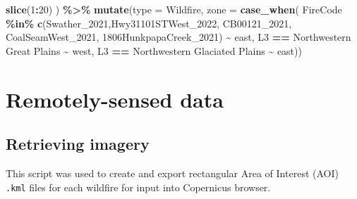 \documentclass[
]{article}
\newenvironment{Shaded}{\begin{snugshade}}{\end{snugshade}}
\newcommand{\AttributeTok}[1]{\textcolor[rgb]{0.13,0.29,0.53}{#1}}
\newcommand{\DecValTok}[1]{\textcolor[rgb]{0.00,0.00,0.81}{#1}}
\newcommand{\FunctionTok}[1]{\textcolor[rgb]{0.13,0.29,0.53}{\textbf{#1}}}
\newcommand{\NormalTok}[1]{#1}
\newcommand{\SpecialCharTok}[1]{\textcolor[rgb]{0.81,0.36,0.00}{\textbf{#1}}}
\newcommand{\StringTok}[1]{\textcolor[rgb]{0.31,0.60,0.02}{#1}}
\begin{document}
\begin{Shaded}
\begin{Highlighting}[]
        \FunctionTok{slice}\NormalTok{(}\DecValTok{1}\SpecialCharTok{:}\DecValTok{20}\NormalTok{) ) }\SpecialCharTok{\%\textgreater{}\%}
     \FunctionTok{mutate}\NormalTok{(}\AttributeTok{type =} \StringTok{\textquotesingle{}Wildfire\textquotesingle{}}\NormalTok{, }
                \AttributeTok{zone =} \FunctionTok{case\_when}\NormalTok{(}
\NormalTok{                  FireCode }\SpecialCharTok{\%in\%} \FunctionTok{c}\NormalTok{(}\StringTok{\textquotesingle{}Swather\_2021\textquotesingle{}}\NormalTok{,}\StringTok{\textquotesingle{}Hwy31101STWest\_2022\textquotesingle{}}\NormalTok{, }\StringTok{\textquotesingle{}CB00121\_2021\textquotesingle{}}\NormalTok{, }
                                  \StringTok{\textquotesingle{}CoalSeamWest\_2021\textquotesingle{}}\NormalTok{, }\StringTok{\textquotesingle{}1806HunkpapaCreek\_2021\textquotesingle{}}\NormalTok{) }\SpecialCharTok{\textasciitilde{}}
                    \StringTok{\textquotesingle{}east\textquotesingle{}}\NormalTok{, }
\NormalTok{                  L3 }\SpecialCharTok{==} \StringTok{\textquotesingle{}Northwestern Great Plains\textquotesingle{}} \SpecialCharTok{\textasciitilde{}} \StringTok{\textquotesingle{}west\textquotesingle{}}\NormalTok{,}
\NormalTok{                  L3 }\SpecialCharTok{==} \StringTok{\textquotesingle{}Northwestern Glaciated Plains\textquotesingle{}} \SpecialCharTok{\textasciitilde{}} \StringTok{\textquotesingle{}east\textquotesingle{}}\NormalTok{))}
\end{Highlighting}
\end{Shaded}

\section{Remotely-sensed data}\label{remotely-sensed-data}

\subsection{Retrieving imagery}\label{retrieving-imagery}

This script was used to create and export rectangular Area of Interest
(AOI) \texttt{.kml} files for each wildfire for input into Copernicus
browser.
\end{document}

